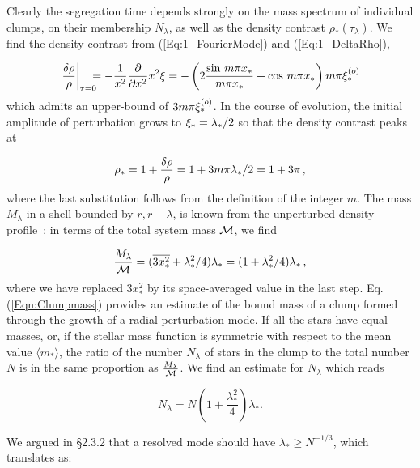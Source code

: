 Clearly the segregation time depends strongly on the mass spectrum of individual clumps, on their membership $N_\lambda$, as well as the density contrast $\rho_\ast(\tau_\lambda)$. We find the density contrast from (\ref{Eq:1_FourierMode}) and (\ref{Eq:1_DeltaRho}),  

\[ \left.\frac{\delta\rho}{\rho}\right|_{\tau=0} \!\!\!\! = - \frac{1}{x^2}\frac{\partial}{\partial x^2} x^2\xi = - \left( 2 \frac{\sin\, m\pi x_\ast }{m\pi x_\ast} + \cos\,m\pi x_\ast \right) m\pi   \xi_\ast^{(o)}
\]
which admits an upper-bound of $3 m\pi \xi_\ast^{(o)}$. In the course of evolution, the initial amplitude of perturbation grows to $\xi_\ast = \lambda_\ast/2$ so that the density contrast peaks at 

\begin{equation} \label{Eqn:Densitypeak} 
  \rho_\ast = 1 + \frac{\delta\rho}{\rho} = 1 + 3 m\pi \lambda_\ast / 2 = 1 + 3\pi\, ,
\end{equation}
where the last substitution follows from the definition of the integer $m$. The mass $M_\lambda$ in a shell bounded by $r, r+ \lambda$, is known from the unperturbed density profile~; in terms of the total system mass ${\cal M}$, we find 

\begin{equation} \label{Eqn:Clumpmass} 
   \frac{M_\lambda}{{\cal M} } = ( \overline{3 x_\ast^2} + \lambda_\ast^2/4 ) \lambda_\ast = ( 1 + \lambda_\ast^2/4) \lambda_\ast \, , 
\end{equation}
where we have replaced $3x_\ast^2$ by its space-averaged value in  the last step.  Eq. (\ref{Eqn:Clumpmass}) provides an estimate of the bound mass of a clump formed through the growth of a radial perturbation mode. If all the stars have equal masses, or, if the stellar mass function is symmetric with respect to the mean value $\langle m_\ast\rangle$, the ratio of the number $N_\lambda$ of stars in the clump to the total number $N$ is in the same proportion as $\frac{M_\lambda}{\cal M}$. We find an estimate for $N_\lambda$ which reads 

\begin{equation} \label{Eqn:Clumpn} 
   N_\lambda = N \left( 1 + \frac{\lambda_\ast^2}{4} \right) \lambda_* .
\end{equation} 

We argued in \S2.3.2 that a resolved mode should have $\lambda_\ast \ge N^{-1/3}$, which translates as: 

